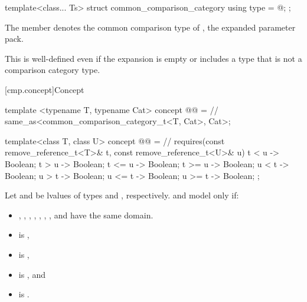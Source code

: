 %
\begin{itemdecl}
template<class... Ts>
struct common_comparison_category {
  using type = @\seebelow@;
};
\end{itemdecl}

\begin{itemdescr}
\pnum
\remarks
The member   denotes
the common comparison type of ,
the expanded parameter pack.
\begin{note}
This is well-defined even if
the expansion is empty or
includes a type that is not a comparison category type.
\end{note}
\end{itemdescr}

[cmp.concept]{Concept }

\begin{codeblock}
template <typename T, typename Cat>
  concept @@ =                 // \expos
    same_as<common_comparison_category_t<T, Cat>, Cat>;

template<class T, class U>
  concept @@ =      // \expos
    requires(const remove_reference_t<T>& t, const remove_reference_t<U>& u) {
      { t <  u } -> Boolean;
      { t >  u } -> Boolean;
      { t <= u } -> Boolean;
      { t >= u } -> Boolean;
      { u <  t } -> Boolean;
      { u >  t } -> Boolean;
      { u <= t } -> Boolean;
      { u >= t } -> Boolean;
    };
\end{codeblock}

\pnum
Let  and  be
lvalues of types  and
, respectively.
 and  model
 only if:
\begin{itemize}
\item
  ,
  ,
  ,
  ,
  ,
  ,
  , and
  have the same domain.
\item
   is ,
\item
   is ,
\item
   is , and
\item
   is .
\end{itemize}

